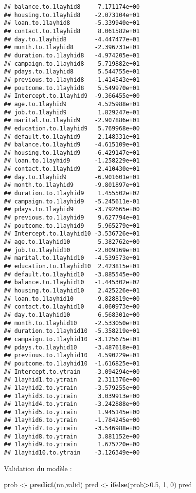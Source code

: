 \documentclass[
]{article}
\newenvironment{Shaded}{\begin{snugshade}}{\end{snugshade}}
\newcommand{\DecValTok}[1]{\textcolor[rgb]{0.00,0.00,0.81}{#1}}
\newcommand{\FloatTok}[1]{\textcolor[rgb]{0.00,0.00,0.81}{#1}}
\newcommand{\KeywordTok}[1]{\textcolor[rgb]{0.13,0.29,0.53}{\textbf{#1}}}
\newcommand{\NormalTok}[1]{#1}
\newcommand{\OperatorTok}[1]{\textcolor[rgb]{0.81,0.36,0.00}{\textbf{#1}}}
\newcommand{\StringTok}[1]{\textcolor[rgb]{0.31,0.60,0.02}{#1}}
\begin{document}
\begin{verbatim}
## balance.to.1layhid8     7.171174e+00
## housing.to.1layhid8    -2.073104e+01
## loan.to.1layhid8       -5.339940e+01
## contact.to.1layhid8     8.061582e+01
## day.to.1layhid8        -4.447477e+01
## month.to.1layhid8      -2.396731e+01
## duration.to.1layhid8   -4.974205e+01
## campaign.to.1layhid8   -5.719882e+01
## pdays.to.1layhid8       5.544755e+01
## previous.to.1layhid8   -1.414543e+01
## poutcome.to.1layhid8    5.549970e+01
## Intercept.to.1layhid9  -9.366455e+00
## age.to.1layhid9         4.525988e+01
## job.to.1layhid9         1.829247e+01
## marital.to.1layhid9    -2.907886e+01
## education.to.1layhid9   5.769968e+00
## default.to.1layhid9     2.148331e+01
## balance.to.1layhid9    -4.615109e+01
## housing.to.1layhid9    -6.429147e+01
## loan.to.1layhid9       -1.258229e+01
## contact.to.1layhid9     2.410430e+01
## day.to.1layhid9        -6.901601e+01
## month.to.1layhid9      -9.801897e+01
## duration.to.1layhid9    1.455502e+02
## campaign.to.1layhid9   -5.245611e-01
## pdays.to.1layhid9      -3.792665e+00
## previous.to.1layhid9    9.627794e+01
## poutcome.to.1layhid9    5.965279e+01
## Intercept.to.1layhid10 -3.536726e+01
## age.to.1layhid10        5.382762e+00
## job.to.1layhid10       -2.009169e+01
## marital.to.1layhid10   -4.539573e+01
## education.to.1layhid10  2.423815e+01
## default.to.1layhid10   -3.885545e+00
## balance.to.1layhid10   -1.445302e+02
## housing.to.1layhid10    2.425226e+01
## loan.to.1layhid10      -9.828819e+00
## contact.to.1layhid10    4.060973e+00
## day.to.1layhid10        6.568301e+00
## month.to.1layhid10     -2.533050e+01
## duration.to.1layhid10  -5.358219e+01
## campaign.to.1layhid10  -3.125675e+01
## pdays.to.1layhid10     -3.487618e+01
## previous.to.1layhid10   4.590229e+01
## poutcome.to.1layhid10  -1.616825e+01
## Intercept.to.ytrain    -3.094294e+00
## 1layhid1.to.ytrain      2.311376e+00
## 1layhid2.to.ytrain     -3.579255e+00
## 1layhid3.to.ytrain      3.039913e+00
## 1layhid4.to.ytrain     -3.242888e+00
## 1layhid5.to.ytrain      1.945145e+00
## 1layhid6.to.ytrain     -1.784245e+00
## 1layhid7.to.ytrain     -3.546988e+00
## 1layhid8.to.ytrain      3.881152e+00
## 1layhid9.to.ytrain      1.675720e+00
## 1layhid10.to.ytrain    -3.126349e+00
\end{verbatim}

Validation du modèle :

\begin{Shaded}
\begin{Highlighting}[]
\NormalTok{prob <-}\StringTok{ }\KeywordTok{predict}\NormalTok{(nn,valid)}
\NormalTok{pred <-}\StringTok{ }\KeywordTok{ifelse}\NormalTok{(prob}\OperatorTok{>}\FloatTok{0.5}\NormalTok{, }\DecValTok{1}\NormalTok{, }\DecValTok{0}\NormalTok{)}
\NormalTok{pred}
\end{Highlighting}
\end{Shaded}
\end{document}
